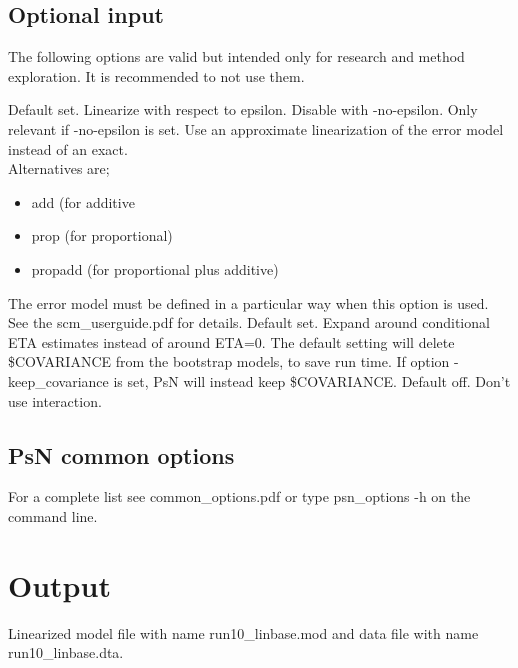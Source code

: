 \subsection{Optional input}
The following options are valid but intended only for research and method exploration. It is recommended to not use them.
\begin{optionlist}
Default set. Linearize with respect to epsilon. Disable with -no-epsilon.
\nextopt
{}
Only relevant if -no-epsilon is set. Use an approximate linearization of the error model instead of an exact.\\
Alternatives are;
\begin{itemize}
\item add (for additive
\item prop (for proportional)
\item propadd (for proportional plus additive)
\end{itemize}
The error model must be defined in a particular way when this option is used. See the scm\_userguide.pdf for details.
\nextopt
{}
Default set. Expand around conditional ETA estimates instead of around ETA=0.  
\nextopt
{}
The default setting will delete \$COVARIANCE from the bootstrap models, to save run time. If option -keep\_covariance is set, PsN will instead keep \$COVARIANCE.
\nextopt
{}
Default off. Don't use interaction. 
\nextopt
\end{optionlist}

\subsection{PsN common options}
For a complete list see common\_options.pdf or type psn\_options -h on the command line.

\section{Output}
Linearized model file with name run10\_linbase.mod and data file with name run10\_linbase.dta.



